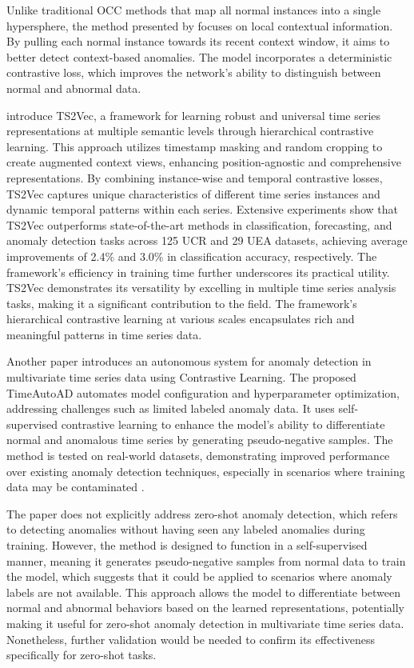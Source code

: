 Unlike traditional OCC methods that map all normal instances into a single hypersphere, the method presented by \cite{chen_time-series_2023} focuses on local contextual information. By pulling each normal instance towards its recent context window, it aims to better detect context-based anomalies. The model incorporates a deterministic contrastive loss, which improves the network's ability to distinguish between normal and abnormal data.

\cite{yue_ts2vec_2022} introduce TS2Vec, a framework for learning robust and universal time series representations at multiple semantic levels through hierarchical contrastive learning. This approach utilizes timestamp masking and random cropping to create augmented context views, enhancing position-agnostic and comprehensive representations. By combining instance-wise and temporal contrastive losses, TS2Vec captures unique characteristics of different time series instances and dynamic temporal patterns within each series. Extensive experiments show that TS2Vec outperforms state-of-the-art methods in classification, forecasting, and anomaly detection tasks across 125 UCR and 29 UEA datasets, achieving average improvements of 2.4\% and 3.0\% in classification accuracy, respectively. The framework's efficiency in training time further underscores its practical utility. TS2Vec demonstrates its versatility by excelling in multiple time series analysis tasks, making it a significant contribution to the field. The framework's hierarchical contrastive learning at various scales encapsulates rich and meaningful patterns in time series data.

Another paper introduces an autonomous system for anomaly detection in multivariate time series data using Contrastive Learning. The proposed TimeAutoAD automates model configuration and hyperparameter optimization, addressing challenges such as limited labeled anomaly data. It uses self-supervised contrastive learning to enhance the model's ability to differentiate normal and anomalous time series by generating pseudo-negative samples. The method is tested on real-world datasets, demonstrating improved performance over existing anomaly detection techniques, especially in scenarios where training data may be contaminated \cite{jiao_timeautoad_2022}.

The paper does not explicitly address zero-shot anomaly detection, which refers to detecting anomalies without having seen any labeled anomalies during training. However, the method is designed to function in a self-supervised manner, meaning it generates pseudo-negative samples from normal data to train the model, which suggests that it could be applied to scenarios where anomaly labels are not available. This approach allows the model to differentiate between normal and abnormal behaviors based on the learned representations, potentially making it useful for zero-shot anomaly detection in multivariate time series data. Nonetheless, further validation would be needed to confirm its effectiveness specifically for zero-shot tasks.

